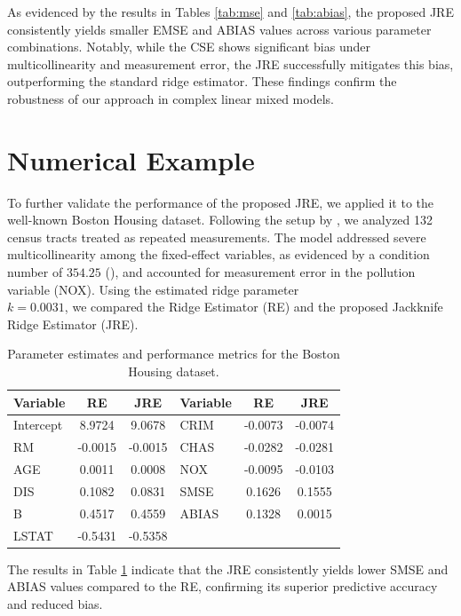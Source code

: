 \documentclass[twoside]{article}
\begin{document}
 As evidenced by the results in Tables \ref{tab:mse} and \ref{tab:abias}, the proposed JRE consistently yields smaller EMSE and ABIAS values across various parameter combinations. Notably, while the CSE shows significant bias under multicollinearity and measurement error, the JRE successfully mitigates this bias, outperforming the standard ridge estimator. These findings confirm the robustness of our approach in complex linear mixed models.

\newpage
\section{Numerical Example}\label{Numerical}

To further validate the performance of the proposed JRE, we applied it to the well-known Boston Housing dataset. Following the setup by \cite{ZF02}, we analyzed 132 census tracts treated as repeated measurements. The model addressed severe multicollinearity among the fixed-effect variables, as evidenced by a condition number of $354.25$ (\cite{Ghapani:2019}), and accounted for measurement error in the pollution variable (NOX). Using the estimated ridge parameter\\
 $k=0.0031$, we compared the Ridge Estimator (RE) and the proposed Jackknife Ridge Estimator (JRE).


\begin{table}[h!]
\centering
\caption{Parameter estimates and performance metrics for the Boston Housing dataset.}
\label{tab:boston}
\begin{tabular}{lcc|lcc}
\toprule
\textbf{Variable} & \textbf{RE} & \textbf{JRE} & \textbf{Variable} & \textbf{RE} & \textbf{JRE} \\
\hline
Intercept & 8.9724 & 9.0678  & CRIM & -0.0073 & -0.0074 \\
RM        & -0.0015 & -0.0015 & CHAS & -0.0282 & -0.0281 \\
AGE       & 0.0011 & 0.0008  & NOX  & -0.0095 & -0.0103 \\
DIS       & 0.1082 & 0.0831  & SMSE & 0.1626 & 0.1555 \\
B         & 0.4517 & 0.4559  & ABIAS & 0.1328 & 0.0015 \\
LSTAT     & -0.5431 & -0.5358 &      &        &        \\
\hline
\end{tabular}
\end{table}


The results in Table \ref{tab:boston} indicate that the JRE consistently yields lower SMSE and ABIAS values compared to the RE, confirming its superior predictive accuracy and reduced bias.
\end{document}
